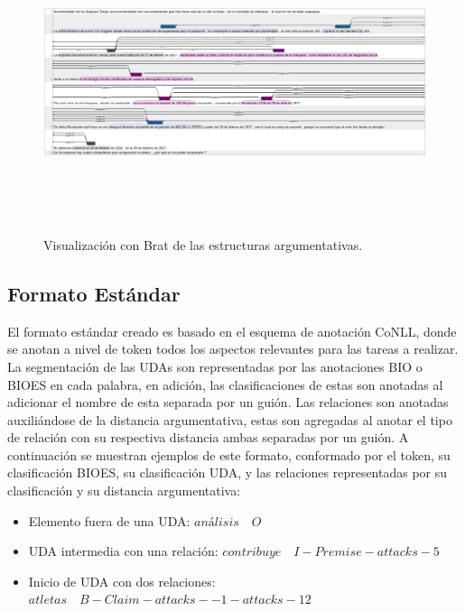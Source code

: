 \begin{figure}[h!]
	\begin{center}
		\includegraphics[scale=.4, width=435pt, height=250pt]{Graphics/persuasive_2019-03-22_inconformidad-con-la-chequera.png}
		\caption{Visualización con Brat de las estructuras argumentativas.}\label{fig:brat_persuasive_granma_letters}
	\end{center}
\end{figure}

\subsection{Formato Estándar}

El formato estándar creado es basado en el esquema de anotación CoNLL, donde se anotan a nivel de token todos los aspectos 
relevantes para las tareas a realizar. La segmentación de las UDAs son representadas por las anotaciones 
BIO o BIOES en cada palabra, en adición, las clasificaciones de estas son anotadas al adicionar el nombre 
de esta separada por un guión. Las relaciones son anotadas auxiliándose de la distancia argumentativa, estas 
son agregadas al anotar el tipo de relación con su respectiva distancia ambas separadas por un guión. A 
continuación se muestran ejemplos de este formato, conformado por el token, su clasificación BIOES, su clasificación
UDA, y las relaciones representadas por su clasificación y su distancia argumentativa:

\begin{itemize}
	\item Elemento fuera de una UDA: $análisis \quad O$
	\item UDA intermedia con una relación: $contribuye \quad I-Premise-attacks-5$
	\item Inicio de UDA con dos relaciones: $atletas \quad B-Claim-attacks--1-attacks-12$
\end{itemize}

